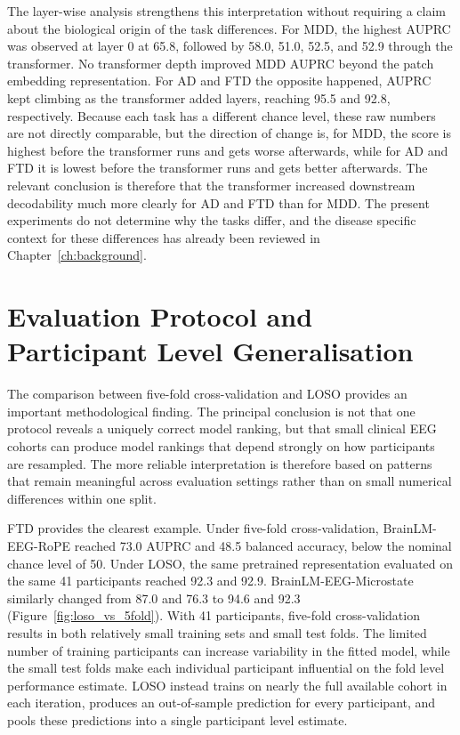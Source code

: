 The layer-wise analysis strengthens this interpretation without requiring a claim about the biological origin of the task differences. For MDD, the highest AUPRC was observed at layer 0 at 65.8, followed by 58.0, 51.0, 52.5, and 52.9 through the transformer. No transformer depth improved MDD AUPRC beyond the patch embedding representation. For AD and FTD the opposite happened, AUPRC kept climbing as the transformer added layers, reaching 95.5 and 92.8, respectively. Because each task has a different chance level, these raw numbers are not directly comparable, but the direction of change is, for MDD, the score is highest before the transformer runs and gets worse afterwards, while for AD and FTD it is lowest before the transformer runs and gets better afterwards. The relevant conclusion is therefore that the transformer increased downstream decodability much more clearly for AD and FTD than for MDD. The present experiments do not determine why the tasks differ, and the disease specific context for these differences has already been reviewed in Chapter~\ref{ch:background}.

\section{Evaluation Protocol and Participant Level Generalisation}\label{sec:d_protocol}

The comparison between five-fold cross-validation and LOSO provides an important methodological finding. The principal conclusion is not that one protocol reveals a uniquely correct model ranking, but that small clinical EEG cohorts can produce model rankings that depend strongly on how participants are resampled. The more reliable interpretation is therefore based on patterns that remain meaningful across evaluation settings rather than on small numerical differences within one split.

FTD provides the clearest example. Under five-fold cross-validation, BrainLM-EEG-RoPE reached 73.0 AUPRC and 48.5 balanced accuracy, below the nominal chance level of 50. Under LOSO, the same pretrained representation evaluated on the same 41 participants reached 92.3 and 92.9. BrainLM-EEG-Microstate similarly changed from 87.0 and 76.3 to 94.6 and 92.3 (Figure~\ref{fig:loso_vs_5fold}). With 41 participants, five-fold cross-validation results in both relatively small training sets and small test folds. The limited number of training participants can increase variability in the fitted model, while the small test folds make each individual participant influential on the fold level performance estimate. LOSO instead trains on nearly the full available cohort in each iteration, produces an out-of-sample prediction for every participant, and pools these predictions into a single participant level estimate.

